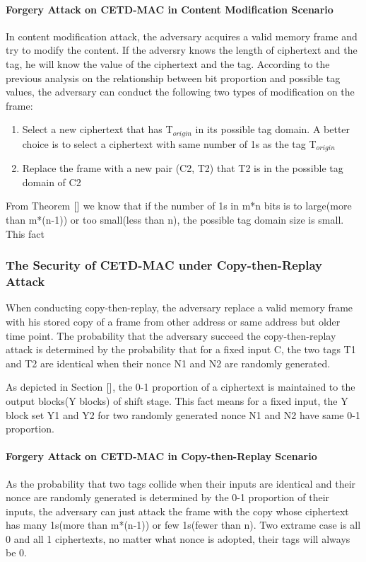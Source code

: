 \documentclass{article}
\begin{document}
\paragraph{Forgery Attack on CETD-MAC in Content Modification Scenario}
In content modification attack, the adversary acquires a valid memory frame and try to modify the content. If the adversry knows the length of ciphertext and the tag, he will know the value of the ciphertext and the tag. According to the previous analysis on the relationship between bit proportion and possible tag values, the adversary can conduct the following two types of modification on the frame:
\begin{enumerate}
	\item Select a new ciphertext that has T$_{origin}$ in its possible tag domain. A better choice is to select a ciphertext with same number of 1s as the tag T$_{origin}$
	\item Replace the frame with a new pair (C2, T2) that T2 is in the possible tag domain of C2
\end{enumerate}
From Theorem $\ref{}$ we know that if the number of 1s in m*n bits is to large(more than m*(n-1)) or too small(less than n), the possible tag domain size is small. This fact 

\subsubsection{The Security of CETD-MAC under Copy-then-Replay Attack}
When conducting copy-then-replay, the adversary replace a valid memory frame with his stored copy of a frame from other address or same address but older time point. The probability that the adversary succeed the copy-then-replay attack is determined by the probability that for a fixed input C, the two tags T1 and T2 are identical when their nonce N1 and N2 are randomly generated.

As depicted in Section $\ref{}$, the 0-1 proportion of a ciphertext is maintained to the output blocks(Y blocks) of shift stage. This fact means for a fixed input, the Y block set Y1 and Y2 for two randomly generated nonce N1 and N2 have same 0-1 proportion.  
\paragraph{Forgery Attack on CETD-MAC in Copy-then-Replay Scenario}
As the probability that two tags collide when their inputs are identical and their nonce are randomly generated is determined by the 0-1 proportion of their inputs, the adversary can just attack the frame with the copy whose ciphertext has many 1s(more than m*(n-1)) or few 1s(fewer than n). Two extrame case is all 0 and all 1 ciphertexts, no matter what nonce is adopted, their tags will always be 0.
\end{document}

